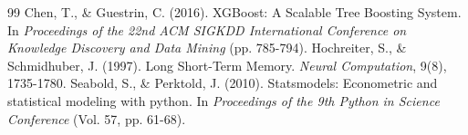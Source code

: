 \documentclass[12pt,a4paper]{article}
\begin{document}
\begin{thebibliography}{99}
 Chen, T., \& Guestrin, C. (2016). XGBoost: A Scalable Tree Boosting System. In \textit{Proceedings of the 22nd ACM SIGKDD International Conference on Knowledge Discovery and Data Mining} (pp. 785-794).
 Hochreiter, S., \& Schmidhuber, J. (1997). Long Short-Term Memory. \textit{Neural Computation}, 9(8), 1735-1780.
 Seabold, S., \& Perktold, J. (2010). Statsmodels: Econometric and statistical modeling with python. In \textit{Proceedings of the 9th Python in Science Conference} (Vol. 57, pp. 61-68).
\end{thebibliography}
\end{document}
